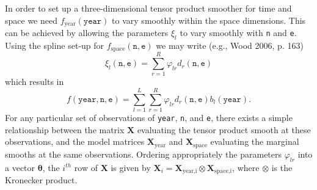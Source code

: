 \documentclass[10pt]{article}
\theoremstyle{definition}
\theoremstyle{plain}
\begin{document}
In order to set up a three-dimensional tensor product smoother for time and space we need $f_\text{year}(\texttt{year})$ to vary smoothly within the space dimensions. This can be achieved by allowing the parameters $\xi_l$ to vary smoothly with \texttt{n} and \texttt{e}. Using the spline set-up for $f_\text{space}(\texttt{n},\texttt{e})$ we may write (e.g., Wood 2006, p. 163)
$$
\xi_l(\texttt{n},\texttt{e})=\sum_{r=1}^R \varphi_{lr} d_r(\texttt{n},\texttt{e})
$$    
which results in
$$
f(\texttt{year},\texttt{n},\texttt{e})=\sum_{l=1}^L \sum_{r=1}^R \varphi_{lr} d_r(\texttt{n},\texttt{e}) b_l(\texttt{year}). 
$$
For any particular set of observations of \texttt{year}, \texttt{n}, and \texttt{e}, there exists a simple relationship between the matrix $\textbf{X}$ evaluating the tensor product smooth at these observations, and the model matrices $\textbf{X}_\text{year}$ and $\textbf{X}_\text{space}$ evaluating the marginal smooths at the same observations. Ordering appropriately the parameters $\varphi_{lr}$ into a vector $\bm\theta$, the $i^{th}$ row of $\textbf{X}$ is given by $\textbf{X}_{i}=\textbf{X}_\text{year,i}\otimes\textbf{X}_\text{space,i}$, where $\otimes$ is the Kronecker product. 
\end{document}

